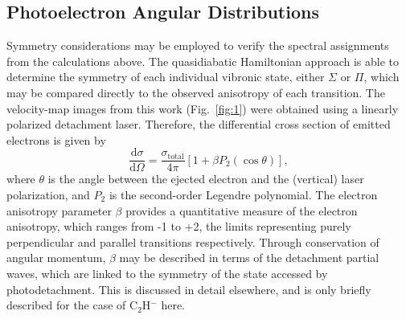 \documentclass[aip,graphicx]{revtex4-1}
\begin{document}
\subsection{Photoelectron Angular Distributions}
Symmetry considerations may be employed to verify the spectral assignments from the calculations above. The quasidiabatic Hamiltonian approach is able to determine the symmetry of each individual vibronic state, either $\Sigma$ or $\Pi$, which may be compared directly to the observed anisotropy of each transition. The velocity-map images from this work (Fig.~\ref{fig:1}) were obtained using a linearly polarized detachment laser. Therefore, the differential cross section of emitted electrons is given by  
\begin{equation}
\frac{\text{d}\sigma}{\text{d}\Omega}=\frac{\sigma_{\text{total}}}{4\pi}[1+\beta P_{2}(\cos\theta)],
\label{eq:10}
\end{equation}
where $\theta$ is the angle between the ejected electron and the (vertical) 
laser polarization, and $P_2$ is the second-order Legendre polynomial. The electron anisotropy parameter $\beta$ provides a quantitative measure of the electron anisotropy, which ranges from -1 to +2, the limits representing purely perpendicular and parallel transitions respectively. Through conservation of angular momentum, $\beta$ may be described in terms of the detachment partial waves, which are linked to the symmetry of the state accessed by photodetachment. This is discussed in detail elsewhere\cite{khu14,law19}, and is only briefly described for the case of C$_2$H$^-$ here. 
\end{document}
